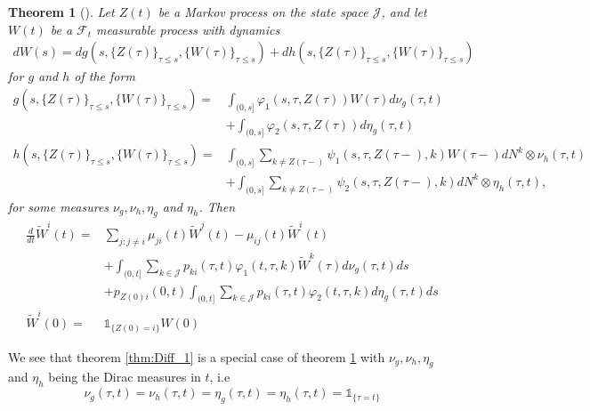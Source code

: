 \documentclass[12pt]{article}
\newcommand{\indic}[1]{\mathds{1}_{ \{ #1 \} }}
\theoremstyle{my_thm}
\newtheorem{thm}{Theorem}[section]
\begin{document}
\begin{thm}[]
\label{thm:Diff_2}
Let $Z(t)$ be a Markov process on the state space $\mathcal{J}$, and let $W(t)$ be a $\mathcal{F}_t$ measurable process with dynamics
\begin{align*}
dW(s)= d g(s,\{Z(\tau)\}_{\tau\leq s},\{W(\tau)\}_{\tau\leq s})+
 d h(s,\{Z(\tau)\}_{\tau\leq s},\{W(\tau)\}_{\tau\leq s})
\end{align*}
for $g$ and $h$ of the form
\begin{align*}
g(s,\{Z(\tau)\}_{\tau\leq s},\{W(\tau)\}_{\tau\leq s})=&\int_{(0,s]} \varphi_1(s,\tau,Z(\tau))W(\tau) d\nu_g(\tau,t)
\\
&+
\int_{(0,s]} \varphi_2(s,\tau,Z(\tau)) d\eta_g(\tau,t)
\\
h(s,\{Z(\tau)\}_{\tau\leq s},\{W(\tau)\}_{\tau\leq s})=&\int_{(0,s]} \sum_{k\neq Z(\tau-)} \psi_1(s,\tau,Z(\tau-),k) W(\tau-)  dN^k\otimes\nu_h(\tau,t)
\\
&+
\int_{(0,s]} \sum_{k\neq Z(\tau-)} \psi_2(s,\tau,Z(\tau-),k)  dN^k\otimes\eta_h(\tau,t),
\end{align*}
for some measures $\nu_g,\nu_h,\eta_g$ and $\eta_h$.
Then
\begin{align*}
\frac{d}{dt}\tilde{W}^i(t)=&
\sum_{j:j \neq i} \mu_{ji}(t) \tilde{W}^j(t)-\mu_{ij}(t)\tilde{W}^i(t)
\\
&+
\int_{(0,t]} \sum_{k \in \mathcal{J}} p_{ki}(\tau,t) \varphi_1(t,\tau,k) \tilde{W}^k(\tau) d\nu_g(\tau,t) ds
\\
&+
p_{Z(0)i}(0,t)\int_{(0,t]} \sum_{k \in \mathcal{J}} p_{ki}(\tau,t) \varphi_2(t,\tau,k) d\eta_g(\tau,t) ds
\\
\tilde{W}^i(0)=&\indic{Z(0)=i}W(0)
\end{align*}

\end{thm}
We see that theorem \ref{thm:Diff_1} is a special case of theorem \ref{thm:Diff_2} with $\nu_g,\nu_h,\eta_g$ and $\eta_h$ being the Dirac measures in $t$, i.e 
$$
\nu_g(\tau,t)=\nu_h(\tau,t)=\eta_g(\tau,t)=\eta_h(\tau,t)=\indic{\tau=t}
$$
\end{document}
